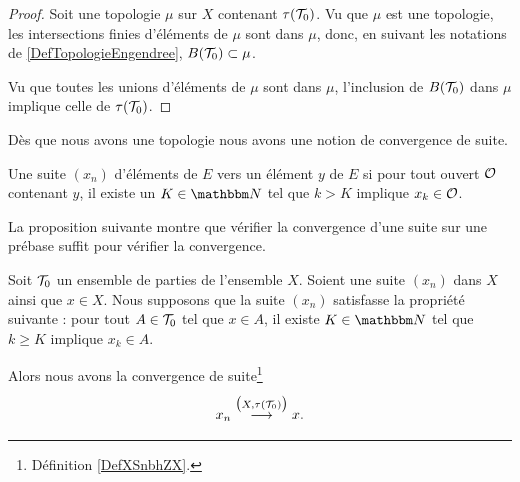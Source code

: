 \begin{proof}
    Soit une topologie \( \mu\) sur \( X\) contenant \( \tau(\mathcal{T}_0)\). Vu que \( \mu\) est une topologie, les intersections finies d'éléments de \( \mu\) sont dans \( \mu\), donc, en suivant les notations de \ref{DefTopologieEngendree}, \( B(\mathcal{T}_0)\subset \mu\).

    Vu que toutes les unions d'éléments de \( \mu\) sont dans \( \mu\), l'inclusion de \( B(\mathcal{T}_0)\) dans \( \mu\) implique celle de \( \tau(\mathcal{T}_0)\).
\end{proof}

Dès que nous avons une topologie nous avons une notion de convergence de suite.
\begin{definition} \label{DefXSnbhZX}
    Une suite $(x_n)$ d'éléments de $E$  vers un élément $y$ de $E$ si pour tout ouvert $\mathcal{O}$ contenant $y$, il existe un $K\in \eN$ tel que $k>K$ implique $x_k\in\mathcal{O}$.
\end{definition}

La proposition suivante montre que vérifier la convergence d'une suite sur une prébase suffit pour vérifier la convergence.
\begin{proposition}     \label{PROPooJTJBooNtczsO}
    Soit \( \mathcal{T}_0\) un ensemble de parties de l'ensemble \( X\). Soient une suite \( (x_n)\) dans \( X\) ainsi que \( x\in X\). Nous supposons que la suite \( (x_n)\) satisfasse la propriété suivante : pour tout \( A\in \mathcal{T}_0\) tel que \( x\in A\), il existe \( K\in \eN\) tel que \( k\geq K\) implique \( x_k\in A\). 

    Alors nous avons la convergence de suite\footnote{Définition \ref{DefXSnbhZX}.}
    \begin{equation}
        x_n\stackrel{\big( X,\tau(\mathcal{T}_0) \big)}{\longrightarrow}x.
    \end{equation}
\end{proposition}

